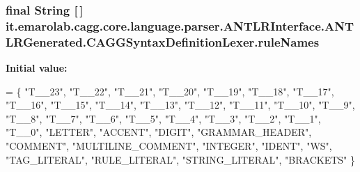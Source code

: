 \hypertarget{classit_1_1emarolab_1_1cagg_1_1core_1_1language_1_1parser_1_1ANTLRInterface_1_1ANTLRGenerated_1_1CAGGSyntaxDefinitionLexer_a31c73f851b28d09e30f7f5417c9099cf}{
\subsubsection[{rule\-Names}]{\setlength{\rightskip}{0pt plus 5cm}final String \mbox{[}$\,$\mbox{]} it.\-emarolab.\-cagg.\-core.\-language.\-parser.\-A\-N\-T\-L\-R\-Interface.\-A\-N\-T\-L\-R\-Generated.\-C\-A\-G\-G\-Syntax\-Definition\-Lexer.\-rule\-Names\hspace{0.3cm}{\ttfamily [static]}}}\label{classit_1_1emarolab_1_1cagg_1_1core_1_1language_1_1parser_1_1ANTLRInterface_1_1ANTLRGenerated_1_1CAGGSyntaxDefinitionLexer_a31c73f851b28d09e30f7f5417c9099cf}
{\bfseries Initial value\-:}
\begin{DoxyCode}
= \{
        \textcolor{stringliteral}{"T\_\_23"}, \textcolor{stringliteral}{"T\_\_22"}, \textcolor{stringliteral}{"T\_\_21"}, \textcolor{stringliteral}{"T\_\_20"}, \textcolor{stringliteral}{"T\_\_19"}, \textcolor{stringliteral}{"T\_\_18"}, \textcolor{stringliteral}{"T\_\_17"}, \textcolor{stringliteral}{"T\_\_16"}, 
        \textcolor{stringliteral}{"T\_\_15"}, \textcolor{stringliteral}{"T\_\_14"}, \textcolor{stringliteral}{"T\_\_13"}, \textcolor{stringliteral}{"T\_\_12"}, \textcolor{stringliteral}{"T\_\_11"}, \textcolor{stringliteral}{"T\_\_10"}, \textcolor{stringliteral}{"T\_\_9"}, \textcolor{stringliteral}{"T\_\_8"}, 
        \textcolor{stringliteral}{"T\_\_7"}, \textcolor{stringliteral}{"T\_\_6"}, \textcolor{stringliteral}{"T\_\_5"}, \textcolor{stringliteral}{"T\_\_4"}, \textcolor{stringliteral}{"T\_\_3"}, \textcolor{stringliteral}{"T\_\_2"}, \textcolor{stringliteral}{"T\_\_1"}, \textcolor{stringliteral}{"T\_\_0"}, \textcolor{stringliteral}{"LETTER"}, 
        \textcolor{stringliteral}{"ACCENT"}, \textcolor{stringliteral}{"DIGIT"}, \textcolor{stringliteral}{"GRAMMAR\_HEADER"}, \textcolor{stringliteral}{"COMMENT"}, \textcolor{stringliteral}{"MULTILINE\_COMMENT"}, \textcolor{stringliteral}{"INTEGER"}, 
        \textcolor{stringliteral}{"IDENT"}, \textcolor{stringliteral}{"WS"}, \textcolor{stringliteral}{"TAG\_LITERAL"}, \textcolor{stringliteral}{"RULE\_LITERAL"}, \textcolor{stringliteral}{"STRING\_LITERAL"}, \textcolor{stringliteral}{"BRACKETS"}
    \}
\end{DoxyCode}


